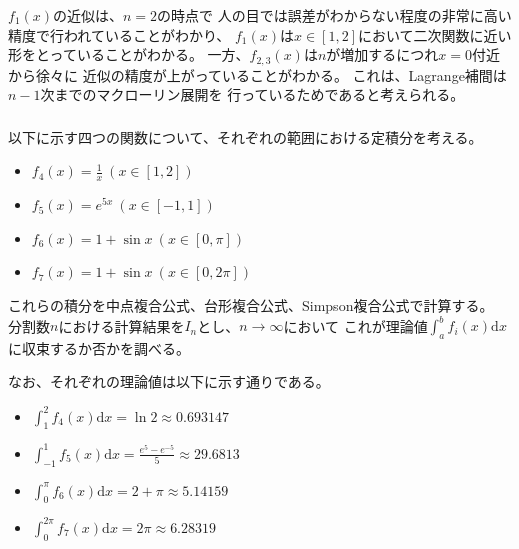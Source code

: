 \documentclass[a4j, titlepage]{jsarticle}
\numberwithin{equation}{section}
\begin{document}
                $f_1(x)$の近似は、$n=2$の時点で
                人の目では誤差がわからない程度の非常に高い精度で行われていることがわかり、
                $f_1(x)$は$x\in[1,2]$において二次関数に近い形をとっていることがわかる。
                一方、$f_{2,3}(x)$は$n$が増加するにつれ$x=0$付近から徐々に
                近似の精度が上がっていることがわかる。
                これは、Lagrange補間は$n-1$次までのマクローリン展開を
                行っているためであると考えられる。

        \subsubsection{}
            以下に示す四つの関数について、それぞれの範囲における定積分を考える。
            \begin{itemize}
                \item $f_4(x) = \displaystyle\frac{1}{x} \ (x\in[1,2])$
                \item $f_5(x) = e^{5x} \ (x\in[-1,1])$
                \item $f_6(x) = 1 + \sin x \ (x\in[0,\pi])$
                \item $f_7(x) = 1 + \sin x \ (x\in[0,2\pi])$
            \end{itemize}

            これらの積分を中点複合公式、台形複合公式、Simpson複合公式で計算する。
            分割数$n$における計算結果を$I_n$とし、$n\rightarrow\infty$において
            これが理論値$\displaystyle\int_a^bf_i(x)\mathrm{d}x$に収束するか否かを調べる。

            なお、それぞれの理論値は以下に示す通りである。
            \begin{itemize}
                \item $\displaystyle\int_1^2f_4(x)\mathrm{d}x = \ln 2 \approx 0.693147$
                \item $\displaystyle\int_{-1}^1f_5(x)\mathrm{d}x = \frac{e^5-e^{-5}}{5} \approx 29.6813$
                \item $\displaystyle\int_0^{\pi}f_6(x)\mathrm{d}x = 2 + \pi \approx 5.14159$
                \item $\displaystyle\int_0^{2\pi}f_7(x)\mathrm{d}x = 2\pi \approx 6.28319$
            \end{itemize}
\end{document}
